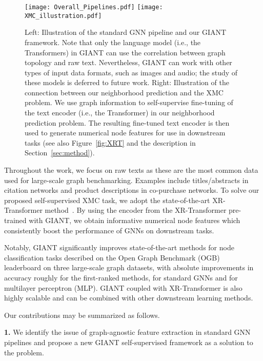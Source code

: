 \documentclass{article} \usepackage{iclr2022_conference,times}
\begin{document}
\begin{figure}[t]
    \centering
    \texttt{[image: Overall\_Pipelines.pdf]}
    \texttt{[image: XMC\_illustration.pdf]}
    \vspace{-0.5cm}
    \caption{Left: Illustration of the standard GNN pipeline and our GIANT framework. Note that only the language model (i.e., the Transformers) in GIANT can use the correlation between graph topology and raw text. Nevertheless, GIANT can work with other types of input data formats, such as images and audio; the study of these models is deferred to future work. Right: Illustration of the connection between our neighborhood prediction and the XMC problem. We use graph information to self-supervise fine-tuning of the text encoder  (i.e., the Transformer) in our neighborhood prediction problem. The resulting fine-tuned text encoder is then used to generate numerical node features  for use in downstream tasks (see also Figure~\ref{fig:XRT} and the description in Section~\ref{sec:method}).}
    \label{fig:pipelines}
    \vspace{-0.3in}
\end{figure}

Throughout the work, we focus on raw texts as these are the most common data used for large-scale graph benchmarking. Examples include titles/abstracts in citation networks and product descriptions in co-purchase networks. To solve our proposed self-supervised XMC task, we adopt the state-of-the-art XR-Transformer method~\citep{jiong2021fast}. By using the encoder from the XR-Transformer pre-trained with GIANT, we obtain informative numerical node features which consistently boost the performance of GNNs on downstream tasks. 


Notably, GIANT significantly improves state-of-the-art methods for node classification tasks described on the Open Graph Benchmark (OGB)~\citep{hu2020open} leaderboard on three large-scale graph datasets, with absolute improvements in accuracy roughly  for the first-ranked methods,  for standard GNNs and  for multilayer perceptron (MLP). GIANT coupled with XR-Transformer is also highly scalable and can be combined with other downstream learning methods.

Our contributions may be summarized as follows.

\textbf{1.} We identify the issue of graph-agnostic feature extraction in standard GNN pipelines and propose a new GIANT self-supervised framework as a solution to the problem.
\end{document}
